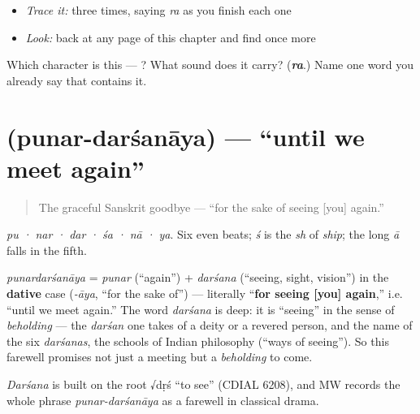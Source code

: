 \begin{quote}
\end{quote}

\begin{itemize}
\raggedright
  \item \emph{Trace it:}  three times, saying \emph{ra} as you finish each one
  \item \emph{Look:} back at any page of this chapter and find  once more
\end{itemize}

\begin{tcolorbox}[breakable,colback=teal!4,colframe=teal!35!black,title={Before you move on}]
Which character is this — ? What sound does it carry? (\emph{\textbf{ra}}.) Name one word you already say that contains it.
\end{tcolorbox}
\section[\texorpdfstring{\sk{पुनर्दर्शनाय} (punardarśanāya)}{पुनर्दर्शनाय (punardarśanāya)}]{ (punar-darśanāya) — \textquotedblleft{}until we meet again\textquotedblright{}}

\label{lesson:SA-C04-punar-darshanaya}



\begin{quote}
The graceful Sanskrit goodbye — \textquotedblleft{}for the sake of seeing {[}you{]} again.\textquotedblright{}
\end{quote}

\begin{sounds}
\emph{pu · nar · dar · śa · nā · ya}. Six even beats; \emph{ś} is the \emph{sh} of \emph{ship}; the long \emph{ā} falls in the fifth.
\end{sounds}

\begin{cousinweb}
\emph{punardarśanāya} = \emph{punar} (\textquotedblleft{}again\textquotedblright{}) + \emph{darśana} (\textquotedblleft{}seeing, sight, vision\textquotedblright{}) in the \textbf{dative} case (\emph{-āya}, \textquotedblleft{}for the sake of\textquotedblright{}) — literally \textquotedblleft{}\textbf{for seeing {[}you{]} again},\textquotedblright{} i.e. \textquotedblleft{}until we meet again.\textquotedblright{} The word \emph{darśana} is deep: it is \textquotedblleft{}seeing\textquotedblright{} in the sense of \emph{beholding} — the \emph{darśan} one takes of a deity or a revered person, and the name of the six \emph{darśanas}, the schools of Indian philosophy (\textquotedblleft{}ways of seeing\textquotedblright{}). So this farewell promises not just a meeting but a \emph{beholding} to come.

\emph{Darśana} is built on the root √dṛś \textquotedblleft{}to see\textquotedblright{} (CDIAL 6208), and MW records the whole phrase \emph{punar-darśanāya} as a farewell in classical drama.
\end{cousinweb}

